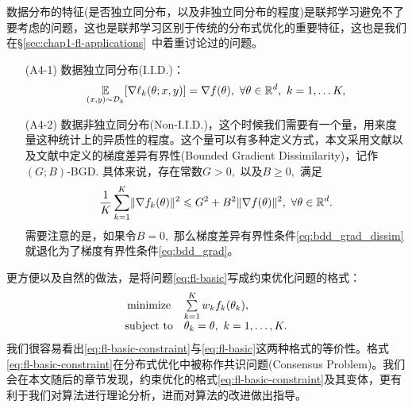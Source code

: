 数据分布的特征(是否独立同分布，以及非独立同分布的程度)是联邦学习避免不了要考虑的问题，这也是联邦学习区别于传统的分布式优化的重要特征，这也是我们在\S\ref{sec:chap1-fl-applications}~中着重讨论过的问题。
\begin{itemize}
\item[(A4-1)] 数据独立同分布(I.I.D.)：
\begin{equation}
\label{eq:iid-1}
\operatorname*{\mathbb{E}}\limits_{(x, y) \sim \mathcal{D}_k}[\nabla \ell_k(\theta; x, y)] = \nabla f(\theta), ~ \forall \theta \in \mathbb{R}^d, ~ k = 1, \ldots K,
\end{equation}
\item[(A4-2)] 数据非独立同分布(Non-I.I.D.)，这个时候我们需要有一个量，用来度量这种统计上的异质性的程度。这个量可以有多种定义方式，本文采用文献\parencite{karimireddy2020scaffold}以及文献\cite{zhang2020fedpd}中定义的梯度差异有界性(Bounded Gradient Dissimilarity)，记作$(G; B)$-BGD. 具体来说，存在常数$G > 0,$ 以及$B \geqslant 0,$ 满足
\begin{equation}
\label{eq:bdd_grad_dissim}
\dfrac{1}{K} \sum\limits_{k=1}^K \lVert \nabla f_k(\theta) \rVert^2 \leqslant G^2 + B^2 \lVert \nabla f(\theta) \rVert^2, ~ \forall \theta \in \mathbb{R}^d.
\end{equation}
需要注意的是，如果令$B = 0,$ 那么梯度差异有界性条件\eqref{eq:bdd_grad_dissim}就退化为了梯度有界性条件\eqref{eq:bdd_grad}。
\end{itemize}

更方便以及自然的做法，是将问题\eqref{eq:fl-basic}写成约束优化问题的格式：
\begin{equation}
\label{eq:fl-basic-constraint}
\begin{array}{cl}
\operatorname*{minimize} & \sum\limits_{k=1}^K w_k f_k(\theta_k), \\
\text{subject to} & \theta_k = \theta, ~ k = 1, \ldots, K.
\end{array}
\end{equation}
我们很容易看出\eqref{eq:fl-basic-constraint}与\eqref{eq:fl-basic}这两种格式的等价性。格式\eqref{eq:fl-basic-constraint}在分布式优化中被称作共识问题(Consensus Problem)。我们会在本文随后的章节发现，约束优化的格式\eqref{eq:fl-basic-constraint}及其变体，更有利于我们对算法进行理论分析，进而对算法的改进做出指导。

